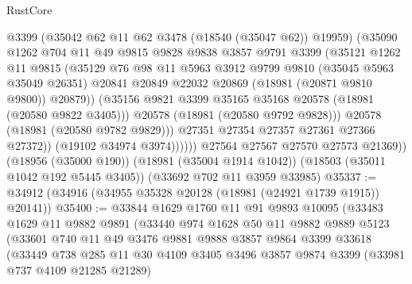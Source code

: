 \begin{lexlean}{RustCore}
\begin{coremodule}
                        @3399
                        (@35042 @62 @11 @62 @3478 (@18540 (@35047 @62)) @19959)
                        (@35090
                          @1262
                          @704
                          @11
                          @49
                          @9815
                          @9828
                          @9838
                          @3857
                          @9791
                          @3399
                          (@35121
                            @1262
                            @11
                            @9815
                            (@35129
                              @76
                              @98
                              @11
                              @5963
                              @3912
                              @9799
                              @9810
                              (@35045 @5963 @35049 @26351)
                              @20841
                              @20849
                              @22032
                              @20869
                              (@18981 (@20871 @9810 @9800))
                              @20879))
                          (@35156 @9821 @3399 @35165 @35168 @20578 (@18981 (@20580 @9822 @3405)))
                          @20578
                          (@18981 (@20580 @9792 @9828)))
                        @20578
                        (@18981 (@20580 @9782 @9829)))
                      @27351
                      @27354
                      @27357
                      @27361
                      @27366
                      @27372))
                  (@19102 @34974 @3974))))))
        @27564
        @27567
        @27570
        @27573
        @21369))
    (@18956 (@35000 @190))
    (@18981 (@35004 @1914 @1042))
    (@18503 (@35011 @1042 @192 @5445 @3405))
    (@33692 @702 @11 @3959 @33985)
@35337 := @34912 (@34916 (@34955 @35328 @20128 (@18981 (@24921 @1739 @1915)) @20141))
@35400 := @33844
    @1629
    @1760
    @11
    @91
    @9893
    @10095
    (@33483
      @1629
      @11
      @9882
      @9891
      (@33440
        @974
        @1628
        @50
        @11
        @9882
        @9889
        @5123
        (@33601
          @740
          @11
          @49
          @3476
          @9881
          @9888
          @3857
          @9864
          @3399
          @33618
          (@33449
            @738
            @285
            @11
            @30
            @4109
            @3405
            @3496
            @3857
            @9874
            @3399
            (@33981 @737 @4109 @21285 @21289)

\end{coremodule}
\end{lexlean}
